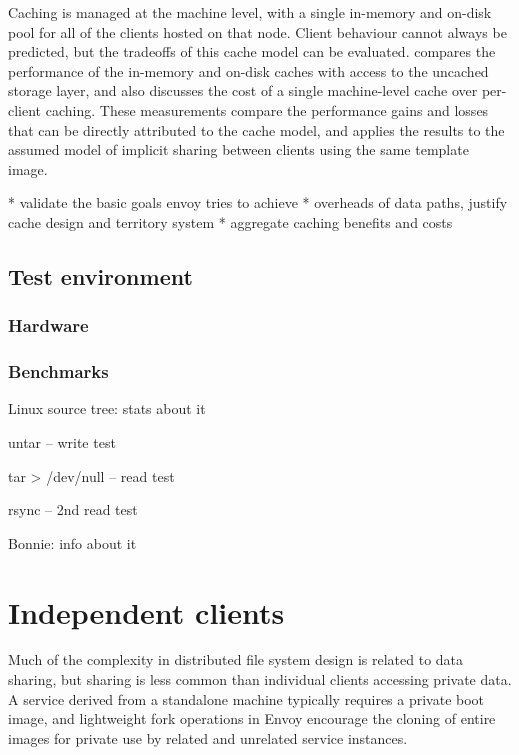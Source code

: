 Caching is managed at the machine level, with a single in-memory and on-disk pool for all of the clients hosted on that node. Client behaviour cannot always be predicted, but the tradeoffs of this cache model can be evaluated.  compares the performance of the in-memory and on-disk caches with access to the uncached storage layer, and also discusses the cost of a single machine-level cache over per-client caching. These measurements compare the performance gains and losses that can be directly attributed to the cache model, and  applies the results to the assumed model of implicit sharing between clients using the same template image.

* validate the basic goals envoy tries to achieve
* overheads of data paths, justify cache design and territory system
* aggregate caching benefits and costs


\subsection{Test environment}

\subsubsection{Hardware}

\subsubsection{Benchmarks}

Linux source tree: stats about it

untar -- write test

tar > /dev/null -- read test

rsync -- 2nd read test

Bonnie: info about it

\section{Independent clients}

Much of the complexity in distributed file system design is related to data sharing, but sharing is less common than individual clients accessing private data. A service derived from a standalone machine typically requires a private boot image, and lightweight fork operations in Envoy encourage the cloning of entire images for private use by related and unrelated service instances.

